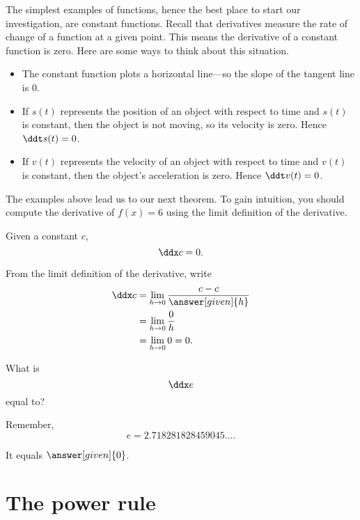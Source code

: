 \documentclass{ximera}
\begin{document}
The simplest examples of functions, hence the best place to start our
investigation, are constant functions.  Recall that derivatives
measure the rate of change of a function at a given point. This means the
derivative of a constant function is zero. Here are some ways to think about
this situation.
\begin{itemize}
\item The constant function plots a horizontal line---so the slope of
  the tangent line is $0$.
\item If $s(t)$ represents the position of an object with respect to
  time and $s(t)$ is constant, then the object is not moving, so its
  velocity is zero. Hence $\ddt s(t) = 0$.
\item If $v(t)$ represents the velocity of an object with respect to
  time and $v(t)$ is constant, then the object's acceleration is
  zero. Hence $\ddt v(t) = 0$.
\end{itemize}
The examples above lead us to our next theorem.
To gain intuition, you should compute the derivative of
  $f(x) = 6$ using the limit definition of the derivative.

\begin{theorem}
Given a constant $c$,
\[
\ddx c = 0.
\]

\begin{explanation}
From the limit definition of the derivative, write
\begin{align*}
\ddx c &= \lim_{h\to 0}\frac{c-c}{\answer[given]{h}}\\
&= \lim_{h\to 0} \frac{0}{h}\\
&= \lim_{h\to 0} 0 = 0.
\end{align*}
\end{explanation}
\end{theorem}

\begin{question}
  What is
  \[
  \ddx e
  \]
  equal to?
  \begin{hint}
    Remember,
    \[
    e = 2.718281828459045\dots.
    \]
  \end{hint}
  \begin{prompt}
    It equals $\answer[given]{0}$.
  \end{prompt}
\end{question}


\section{The power rule}
\end{document}
